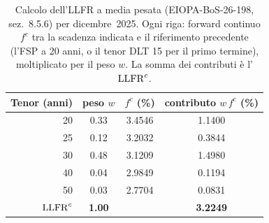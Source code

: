\begin{table}[H]\centering\small
\caption{Calcolo dell'LLFR a media pesata (EIOPA-BoS-26-198, sez.~8.5.6) per dicembre~2025. Ogni riga: forward continuo $f^c$ tra la scadenza indicata e il riferimento precedente (l'FSP a 20 anni, o il tenor DLT 15 per il primo termine), moltiplicato per il peso $w$. La somma dei contributi \`e l'$\mathrm{LLFR}^c$.}
\label{tab:llfr-weighted}\renewcommand{\arraystretch}{1.2}
\begin{tabular}{rccc}
\toprule
Tenor (anni) & peso $w$ & $f^c$ (\%) & contributo $w\,f^c$ (\%)\\
\midrule
\rowcolor{rowtint}20 & 0.33 & 3.4546 & 1.1400\\
25 & 0.12 & 3.2032 & 0.3844\\
\rowcolor{rowtint}30 & 0.48 & 3.1209 & 1.4980\\
40 & 0.04 & 2.9849 & 0.1194\\
\rowcolor{rowtint}50 & 0.03 & 2.7704 & 0.0831\\
\midrule
\textbf{$\mathrm{LLFR}^c$} & \textbf{1.00} & & \textbf{3.2249}\\
\bottomrule
\end{tabular}
\end{table}

